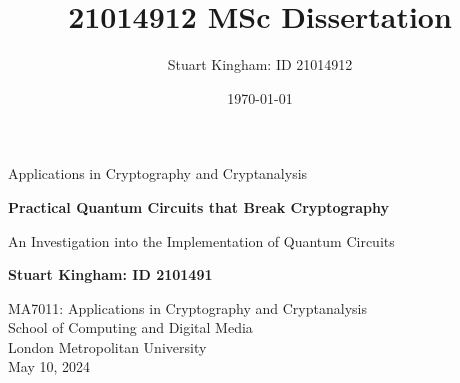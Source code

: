 \documentclass[11pt,a4paper]{article}
\author{Stuart Kingham: ID 21014912}
\title{21014912 MSc Dissertation}
\date{\today}
\begin{document}
\doublespacing

\begin{titlepage}
  \vspace*{\fill}
  \begin{center}
       \vspace*{1cm}

       {\LARGE Applications in Cryptography and Cryptanalysis}

       \vspace*{1cm}
       {\large \textbf{Practical Quantum Circuits that Break Cryptography}}
       
       \vspace{0.2cm}
       {\large An Investigation into the Implementation of Quantum Circuits}
            

       \vfill

       \textbf{Stuart Kingham: ID 2101491}

       \vfill
                        
       \vspace{0.8cm}
     

       MA7011: Applications in Cryptography and Cryptanalysis \\
       School of Computing and Digital Media\\
       London Metropolitan University\\
       May 10, 2024
            
  \end{center}
  \vspace*{\fill}
\end{titlepage}

\pagebreak



\newpage

\singlespacing 
\tableofcontents
\listoffigures

\doublespacing
{}

\newpage



\pagebreak



\pagebreak



\pagebreak



\pagebreak



\pagebreak

\printbibliography

\pagebreak

\appendix











\pagebreak

\printindex
\end{document}
